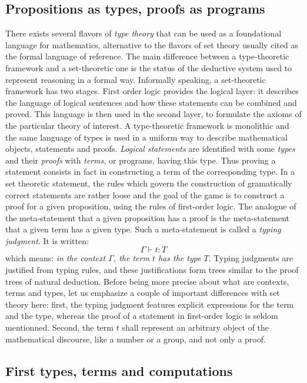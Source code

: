 \subsection{Propositions as types, proofs as programs}
There exists several flavors of \emph{type theory} that can be used
as a foundational language for mathematics, alternative to the
flavors of set theory usually cited as the formal language of
reference.
The main difference between a type-theoretic framework and
a set-theoretic one is the status of the deductive system used to
represent reasoning in a formal way. Informally speaking, a
set-theoretic framework has two stages. First order logic provides the
logical layer: it describes the language of logical sentences and how
these statements can be combined and proved. This language is then
used in the second layer, to formulate the axioms of the particular
theory of interest. A type-theoretic framework is monolithic and the
same language of types is used in a uniform way to describe
mathematical objects, statements and proofs. \emph{Logical statements}
are identified with some \emph{types} and their \emph{proofs} with
\emph{terms}, or programs, having this type. Thus proving a statement
consists in fact in constructing a term of the corresponding type. In a
set theoretic statement, the rules which govern the construction of
gramatically correct statements are rather loose and the goal of the
game is to construct a proof for a given proposition, using the rules
of first-order logic. The analogue of the meta-statement that a given
proposition has a proof is the meta-statement that a given term has a
given type. Such a meta-statement is called a \emph{typing
  judgment}. It is written:
$$\Gamma \vdash t : T$$
which means:
\emph{in the context $\Gamma$, the term $t$ has the type $T$}.
Typing judgments are justified from typing rules, and these
justifications form trees similar to the proof trees of natural deduction.
Before being more precise about what are contexts, terms and types,
let us emphasize a couple of important differences with set theory
here: first, the typing judgment features explicit expressions for
the term and the type, whereas the proof of a statement in first-order
logic is seldom mentionned. Second, the term $t$ shall represent an
arbitrary object of the mathematical discourse, like a number or a
group, and not only a proof.


\subsection{First types, terms and computations}

